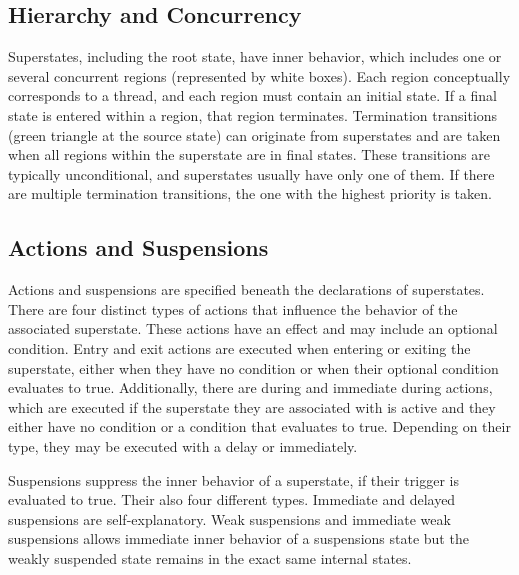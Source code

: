 \subsection{Hierarchy and Concurrency}
Superstates, including the root state, have inner behavior, which includes one or several concurrent regions (represented by white boxes). Each region conceptually corresponds to a thread, and each region must contain an initial state. If a final state is entered within a region, that region terminates. Termination transitions (green triangle at the source state) can originate from superstates and are taken when all regions within the superstate are in final states. These transitions are typically unconditional, and superstates usually have only one of them. If there are multiple termination transitions, the one with the highest priority is taken.~\cite{Motika.2017}

\subsection{Actions and Suspensions}

Actions and suspensions are specified beneath the declarations of superstates. There are four distinct types of actions that influence the behavior of the associated superstate. These actions have an effect and may include an optional condition. Entry and exit actions are executed when entering or exiting the superstate, either when they have no condition or when their optional condition evaluates to true. Additionally, there are during and immediate during actions, which are executed if the superstate they are associated with is active and they either have no condition or a condition that evaluates to true. Depending on their type, they may be executed with a delay or immediately.~\cite{Motika.2017}

Suspensions suppress the inner behavior of a superstate, if their trigger is evaluated to true. Their also four different types. Immediate and delayed suspensions are self-explanatory. Weak suspensions and immediate weak suspensions allows immediate inner behavior of a suspensions state but the weakly suspended state remains in the exact same internal states.~\cite{Motika.2017}

